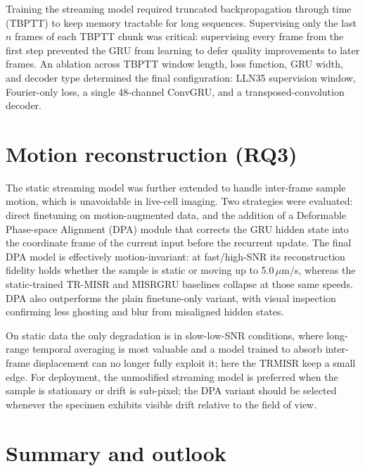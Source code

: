 Training the streaming model required truncated backpropagation through time (TBPTT) to
keep memory tractable for long sequences.
Supervising only the last $n$ frames of each TBPTT chunk was critical: supervising every
frame from the first step prevented the GRU from learning to defer quality improvements to
later frames.
An ablation across TBPTT window length, loss function, GRU width, and decoder type
determined the final configuration: LLN35 supervision window, Fourier-only loss, a single
48-channel ConvGRU, and a transposed-convolution decoder.

\section*{Motion reconstruction (RQ3)}

The static streaming model was further extended to handle inter-frame sample motion, which
is unavoidable in live-cell imaging.
Two strategies were evaluated: direct finetuning on motion-augmented data, and the addition
of a Deformable Phase-space Alignment (DPA) module that corrects the GRU hidden state
into the coordinate frame of the current input before the recurrent update.
The final DPA model is effectively motion-invariant: at fast/high-SNR its reconstruction
fidelity holds whether the sample is static or moving up to 5.0\,$\mu$m/s, whereas the
static-trained TR-MISR and MISRGRU baselines collapse at those same speeds.
DPA also outperforms the plain finetune-only variant, with visual inspection confirming less
ghosting and blur from misaligned hidden states.

On static data the only degradation is in slow-low-SNR conditions, where long-range temporal
averaging is most valuable and a model trained to absorb inter-frame displacement can no
longer fully exploit it; here the TRMISR keep a small edge.
For deployment, the unmodified streaming model is preferred when the sample is stationary
or drift is sub-pixel; the DPA variant should be selected whenever the specimen exhibits
visible drift relative to the field of view.

\section*{Summary and outlook}

